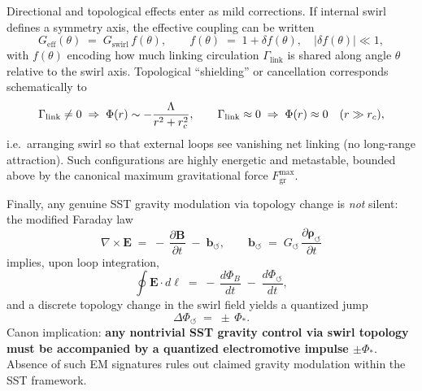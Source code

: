 \documentclass[11pt]{article}
\begin{document}
            Directional and topological effects enter as mild corrections. If internal swirl defines a symmetry axis, the effective coupling can be written
            \begin{equation}
                G_{\text{eff}}(\theta)
                \;=\; G_{\text{swirl}}\,f(\theta),
                \qquad
                f(\theta) \;=\; 1 + \delta f(\theta),
                \quad |\delta f(\theta)| \ll 1,
            \end{equation}
            with $f(\theta)$ encoding how much linking circulation $\Gamma_{\text{link}}$ is shared along angle $\theta$ relative to the swirl axis. Topological ``shielding'' or cancellation corresponds schematically to
            \begin{equation}
                \Gamma_{\text{link}}\neq 0
                \;\Rightarrow\;
                \Phi(r)\sim -\frac{\Lambda}{r^{2}+r_c^{2}},
                \qquad
                \Gamma_{\text{link}}\approx 0
                \;\Rightarrow\;
                \Phi(r)\approx 0 \quad (r\gg r_c),
            \end{equation}
            i.e.\ arranging swirl so that external loops see vanishing net linking (no long-range attraction). Such configurations are highly energetic and metastable, bounded above by the canonical maximum gravitational force $F_{\text{gr}}^{\max}$.

            Finally, any genuine SST gravity modulation via topology change is \emph{not} silent: the modified Faraday law
            \begin{equation}
                \nabla\times\mathbf{E}
                \;=\;
                -\,\frac{\partial\mathbf{B}}{\partial t}
                \;-\;
                \mathbf{b}_{\!\boldsymbol{\circlearrowleft}},
                \qquad
                \mathbf{b}_{\!\boldsymbol{\circlearrowleft}}
                \;=\;
                G_{\!\boldsymbol{\circlearrowleft}}\,
                \frac{\partial\boldsymbol{\rho}_{\!\boldsymbol{\circlearrowleft}}}{\partial t}
            \end{equation}
            implies, upon loop integration,
            \begin{equation}
                \oint \mathbf{E}\!\cdot d\boldsymbol{\ell}
                \;=\;
                -\,\frac{d\Phi_{B}}{dt}
                \;-\;
                \frac{d\Phi_{\!\boldsymbol{\circlearrowleft}}}{dt},
            \end{equation}
            and a discrete topology change in the swirl field yields a quantized jump
            \begin{equation}
                \Delta\Phi_{\!\boldsymbol{\circlearrowleft}}
                \;=\;
                \pm\,\Phi_{\ast}.
            \end{equation}
            Canon implication: \textbf{any nontrivial SST gravity control via swirl topology must be accompanied by a quantized electromotive impulse $\pm\Phi_{\ast}$}. Absence of such EM signatures rules out claimed gravity modulation within the SST framework.
\end{document}
